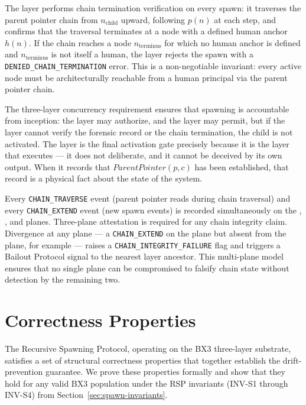 The \fact{} layer performs chain termination verification on every spawn: it traverses the parent pointer chain from $n_{\text{child}}$ upward, following $p(n)$ at each step, and confirms that the traversal terminates at a node with a defined human anchor $h(n)$. If the chain reaches a node $n_{\text{terminus}}$ for which no human anchor is defined and $n_{\text{terminus}}$ is not itself a human, the \fact{} layer rejects the spawn with a \texttt{DENIED\_CHAIN\_TERMINATION} error. This is a non-negotiable invariant: every active node must be architecturally reachable from a human principal via the parent pointer chain.

The three-layer concurrency requirement ensures that spawning is accountable from inception: the \purpose{} layer may authorize, and the \bounds{} layer may permit, but if the \fact{} layer cannot verify the forensic record or the chain termination, the child is not activated. The \fact{} layer is the final activation gate precisely because it is the layer that executes — it does not deliberate, and it cannot be deceived by its own output. When it records that $\textit{ParentPointer}(p, c)$ has been established, that record is a physical fact about the state of the system.

Every \texttt{CHAIN\_TRAVERSE} event (parent pointer reads during chain traversal) and every \texttt{CHAIN\_EXTEND} event (new spawn events) is recorded simultaneously on the \purpose{}, \bounds{}, and \fact{} planes. Three-plane attestation is required for any chain integrity claim. Divergence at any plane — a \texttt{CHAIN\_EXTEND} on the \fact{} plane but absent from the \purpose{} plane, for example — raises a \texttt{CHAIN\_INTEGRITY\_FAILURE} flag and triggers a Bailout Protocol signal to the nearest \purpose{} layer ancestor. This multi-plane model ensures that no single plane can be compromised to falsify chain state without detection by the remaining two.

\vfill

\section{Correctness Properties}
\label{sec:correctness-properties}

The Recursive Spawning Protocol, operating on the BX3 three-layer substrate, satisfies a set of structural correctness properties that together establish the drift-prevention guarantee. We prove these properties formally and show that they hold for any valid BX3 population under the RSP invariants (INV-S1 through INV-S4) from Section~\ref{sec:spawn-invariants}.

